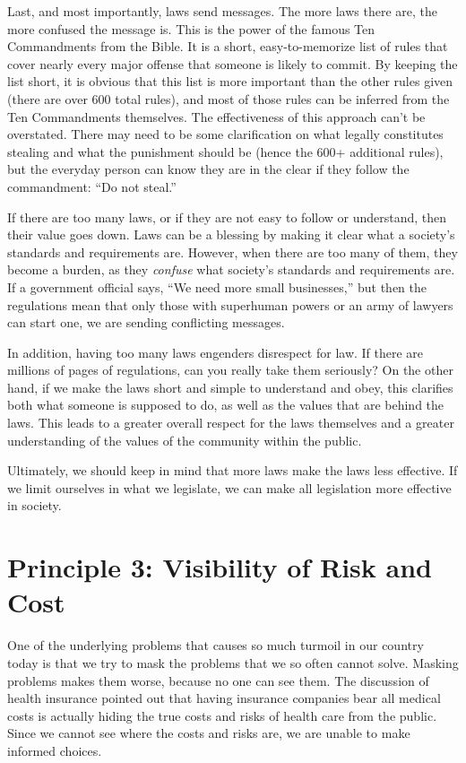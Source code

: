 Last, and most importantly, laws send messages. The more laws there are,
the more confused the message is. This is the power of the famous Ten
Commandments from the Bible. It is a short, easy-to-memorize list of
rules that cover nearly every major offense that someone is likely to
commit. By keeping the list short, it is obvious that this list is more
important than the other rules given (there are over 600 total rules),
and most of those rules can be inferred from the Ten Commandments
themselves. The effectiveness of this approach can't
be overstated. There may need to be some clarification on what legally
constitutes stealing and what the punishment should be (hence the 600+
additional rules), but the everyday person can know they are in the
clear if they follow the commandment: “Do not steal.”  

If there are too many laws, or if they are not easy to follow or
understand, then their value goes down. Laws can be a blessing by
making it clear what a society's standards and
requirements are. However, when there are too many of them, they become
a burden, as they \textit{confuse} what society's
standards and requirements are. If a government official says, “We need
more small businesses,” but then the regulations mean that only those
with superhuman powers or an army of lawyers can start one, we are
sending conflicting messages.

In addition, having too many laws engenders disrespect for law. If there
are millions of pages of regulations, can you really take them
seriously?  On the
other hand, if we make the laws short and simple to understand and
obey, this clarifies both what someone is supposed to do, as well as
the values that are behind
the laws. This leads
to a greater overall respect for the laws themselves and a greater
understanding of the values of the community within the public.

Ultimately, we should
keep in mind that more laws make the laws less effective.  If we limit
ourselves in what we legislate, we can make all legislation more
effective in society. 

\section{Principle 3: Visibility of Risk and Cost}

One of the underlying problems that causes so much turmoil in our
country today is that
we try to mask the
problems that we so often cannot solve.  Masking problems makes them
worse, because no one can see them. The discussion of health insurance
pointed out that having insurance companies bear all medical costs is
actually hiding the true costs and risks of health care from the
public. Since we cannot see where the costs and risks are, we are
unable to make informed choices.

